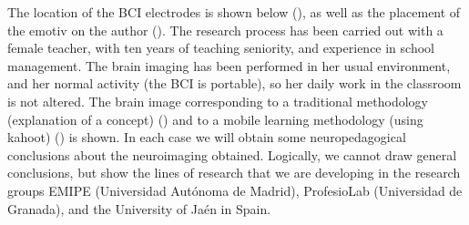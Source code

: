 \documentclass[english]{textolivre}
\begin{document}
The location of the BCI electrodes is shown below (), as well as the placement of the emotiv on the author (). The research process has been carried out with a female teacher, with ten years of teaching seniority, and experience in school management. The brain imaging has been performed in her usual environment, and her normal activity (the BCI is portable), so her daily work in the classroom is not altered. The brain image corresponding to a traditional methodology (explanation of a concept) () and to a mobile learning  methodology (using kahoot) () is shown. In each case we will obtain some neuropedagogical conclusions about the neuroimaging obtained. Logically, we cannot draw general conclusions, but show the lines of research that we are developing in the research groups EMIPE (Universidad Autónoma de Madrid), ProfesioLab (Universidad de Granada), and the University of Jaén in Spain.
\end{document}
